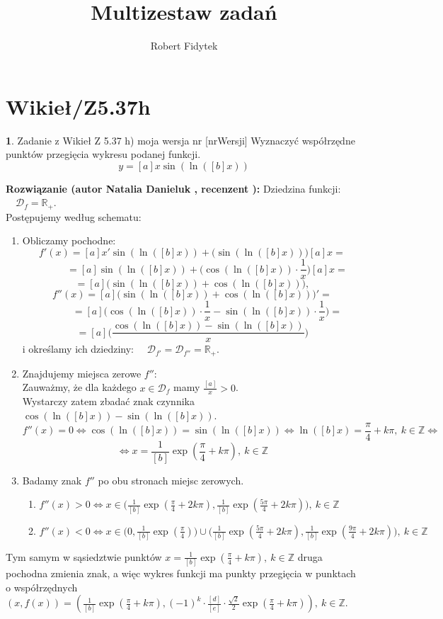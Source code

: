 \documentclass[12pt, a4paper]{article}
\title{Multizestaw zadań}
\author{Robert Fidytek}
\date{}
\theoremstyle{definition} %
\newtheorem{zad}{}
\newcommand{\kategoria}[1]{\section{#1}} %
\newcommand{\zadStart}[1]{\begin{zad}#1\newline} %
\newcommand{\zadStop}{\end{zad}}   %
\newcommand{\rozwStart}[2]{\noindent \textbf{Rozwiązanie (autor #1 , recenzent #2): }\newline} %
\newcommand{\rozwStop}{\newline}                                            %
\begin{document}
\maketitle

\kategoria{Wikieł/Z5.37h}

\zadStart{Zadanie z Wikieł Z 5.37 h) moja wersja nr [nrWersji]}
Wyznaczyć współrzędne punktów przegięcia wykresu podanej funkcji.
$$y = [a]x\sin (\ln([b]x))$$
\zadStop

\rozwStart{Natalia Danieluk}{}
Dziedzina funkcji: $\quad \mathcal{D}_f=\mathbb{R_+}$. \\
Postępujemy według schematu:
\begin{enumerate}
\item Obliczamy pochodne: 
$$f'(x) = [a]x'\sin (\ln([b]x)) + \Big(\sin (\ln([b]x)) \Big)[a]x = $$
$$\quad\quad\quad= [a]\sin (\ln([b]x)) + \Big(\cos (\ln([b]x)) \cdot \frac{1}{x}\Big)[a]x = $$
$$= [a]\big(\sin (\ln([b]x)) + \cos (\ln([b]x)) \big),$$ 
$$f''(x) = [a]\big(\sin (\ln([b]x)) + \cos (\ln([b]x)) \big)' = $$
$$\quad\quad\quad= [a]\big(\cos (\ln([b]x)) \cdot \frac{1}{x} - \sin (\ln([b]x)) \cdot \frac{1}{x} \big) = $$
$$= [a]\Bigg(\frac{\cos (\ln([b]x)) - \sin (\ln([b]x))}{x}\Bigg)$$
i określamy ich dziedziny: $\quad \mathcal{D}_{f'}=\mathcal{D}_{f''}=\mathbb{R_+}$. \\
\item Znajdujemy miejsca zerowe $f''$: \\
Zauważmy, że dla każdego $x \in \mathcal{D}_f$ mamy $\frac{[a]}{x} > 0$. \\
Wystarczy zatem zbadać znak czynnika $\cos (\ln([b]x)) - \sin (\ln([b]x))$. \\
$$f''(x)=0 \Leftrightarrow \cos (\ln([b]x)) = \sin (\ln([b]x)) \Leftrightarrow \ln([b]x) = \frac{\pi}{4} + k\pi, \ k\in\mathbb{Z} \Leftrightarrow $$
$$\Leftrightarrow x=\frac{1}{[b]}\exp(\frac{\pi}{4} + k\pi), \ k\in\mathbb{Z}$$
\item Badamy znak $f''$ po obu stronach miejsc zerowych. \\
	\begin{enumerate}
	\item $f''(x) > 0 \Leftrightarrow x \in \big(\frac{1}{[b]}\exp(\frac{\pi}{4}+ 2k\pi),\frac{1}{[b]}\exp(\frac{5\pi}{4}+ 2k\pi)\big), \ k\in\mathbb{Z}$\\
	\item $f''(x) < 0 \Leftrightarrow x \in \big(0,\frac{1}{[b]}\exp(\frac{\pi}{4})\big)\cup\big(\frac{1}{[b]}\exp(\frac{5\pi}{4} + 2k\pi),\frac{1}{[b]}\exp(\frac{9\pi}{4} + 2k\pi)\big), \ k\in\mathbb{Z}$
	\end{enumerate}
\end{enumerate}
Tym samym w sąsiedztwie punktów $x=\frac{1}{[b]}\exp(\frac{\pi}{4} + k\pi), \ k\in\mathbb{Z}$ druga pochodna zmienia znak, a więc wykres funkcji ma punkty przegięcia w punktach o współrzędnych $(x,f(x)) = (\frac{1}{[b]}\exp(\frac{\pi}{4} + k\pi),(-1)^k \cdot \frac{[d]}{[e]} \cdot \frac{\sqrt{2}}{2} \exp(\frac{\pi}{4} + k\pi)), \ k\in\mathbb{Z}$.
\rozwStop
\end{document}
